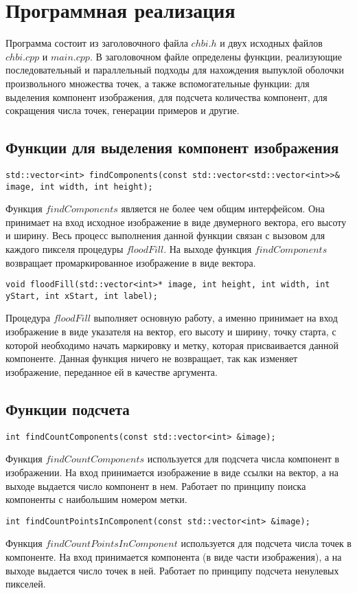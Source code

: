 \section{Программная реализация}
Программа состоит из заголовочного файла $chbi.h$ и двух исходных файлов $chbi.cpp$ и $main.cpp$.\n
В заголовочном файле определены функции, реализующие последовательный и параллельный подходы для нахождения выпуклой оболочки произвольного множества точек, а также вспомогательные функции: для выделения компонент изображения, для подсчета количества компонент, для сокращения числа точек, генерации примеров и другие.

\subsection{Функции для выделения компонент изображения}
\begin{verbatim}
std::vector<int> findComponents(const std::vector<std::vector<int>>& image, int width, int height);
\end{verbatim}
Функция $findComponents$ является не более чем общим интерфейсом. Она принимает на вход исходное изображение в виде двумерного вектора, его высоту и ширину. Весь процесс выполнения данной функции связан с вызовом для каждого пикселя процедуры $floodFill$. На выходе функция $findComponents$ возвращает промаркированное изображение в виде вектора.
\begin{verbatim}
void floodFill(std::vector<int>* image, int height, int width, int yStart, int xStart, int label);
\end{verbatim}
Процедура $floodFill$ выполняет основную работу, а именно принимает на вход изображение в виде указателя на вектор, его высоту и ширину, точку старта, с которой необходимо начать маркировку и метку, которая присваивается данной компоненте. Данная функция ничего не возвращает, так как изменяет изображение, переданное ей в качестве аргумента.

\subsection{Функции подсчета}
\begin{verbatim}
int findCountComponents(const std::vector<int> &image);
\end{verbatim}
Функция $findCountComponents$ используется для подсчета числа компонент в изображении. На вход принимается изображение в виде ссылки на вектор, а на выходе выдается число компонент в нем. Работает по принципу поиска компоненты с наибольшим номером метки.
\begin{verbatim}
int findCountPointsInComponent(const std::vector<int> &image);
\end{verbatim}
Функция $findCountPointsInComponent$ используется для подсчета числа точек в компоненте. На вход принимается компонента (в виде части изображения), а на выходе выдается число точек в ней. Работает по принципу подсчета ненулевых пикселей.


